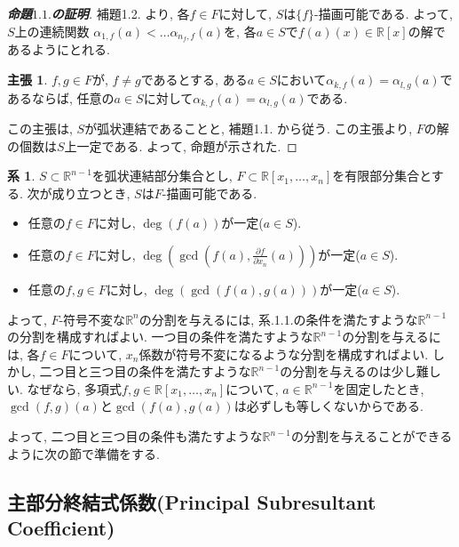 \documentclass[dvipdfmx]{jsarticle}
\newcommand{\R}{\mathbb{R}}
\theoremstyle{definition}
\newtheorem{corollary}{系}[section]
\newtheorem*{claim*}{主張}
\begin{document}
\begin{proof}[{\bf 命題$1.1.$の証明}]

補題1.2. より, 各$f \in F$に対して, $S$は$\{f\}$-描画可能である.
よって,$S$上の連続関数 $\alpha_{1,f}(a) < \dots \alpha_{n_f, f}(a)$を, 各$a \in S$で$f(a)(x) \in \R[x]$の解であるようにとれる.

\begin{claim*}
$f, g \in F$が, $f \neq g$であるとする,
ある$a \in S$において$\alpha_{k,f}(a) = \alpha_{l,g}(a)$であるならば, 任意の$a \in S$に対して$\alpha_{k,f}(a) = \alpha_{l,g}(a)$である.
\end{claim*}

この主張は, $S$が弧状連結であることと, 補題1.1. から従う. 
この主張より, $F$の解の個数は$S$上一定である. よって, 命題が示された.
\end{proof}

\begin{corollary}
$S \subset \R^{n-1}$を弧状連結部分集合とし, $F \subset \R[x_1,\dots, x_n]$を有限部分集合とする.
次が成り立つとき, $S$は$F$-描画可能である.
\begin{itemize}
\item 任意の$f \in F$に対し, $\deg(f(a))$が一定($a \in S$).
\item 任意の$f \in F$に対し, $\deg(\gcd(f(a), \frac{\partial f}{\partial x_n}(a)))$が一定($a \in S$).
\item 任意の$f, g \in F$に対し, $\deg(\gcd(f(a), g(a)))$が一定($a \in S$).
\end{itemize}
\end{corollary}

よって, $F$-符号不変な$\R^n$の分割を与えるには, 系.1.1.の条件を満たすような$\R^{n-1}$の分割を構成すればよい.
一つ目の条件を満たすような$\R^{n-1}$の分割を与えるには, 各$f \in F$について, $x_n$係数が符号不変になるような分割を構成すればよい.
しかし, 二つ目と三つ目の条件を満たすような$\R^{n-1}$の分割を与えるのは少し難しい. 
なぜなら, 多項式$f, g \in \R[x_1, \dots, x_n]$について, $a \in \R^{n-1}$を固定したとき, $\gcd(f,g)(a)$と$\gcd(f(a),g(a))$は必ずしも等しくないからである.

よって, 二つ目と三つ目の条件も満たすような$\R^{n-1}$の分割を与えることができるように次の節で準備をする.



\subsection{主部分終結式係数(Principal Subresultant Coefficient)}
\end{document}
